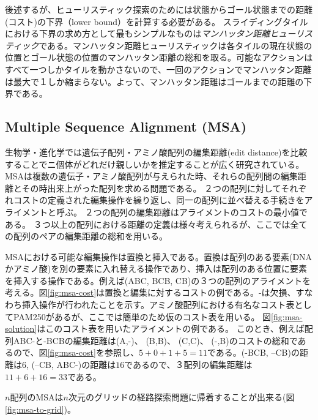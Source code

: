 \documentclass{report}
\begin{document}
後述するが、ヒューリスティック探索のためには状態からゴール状態までの距離(コスト)の下界（lower bound）を計算する必要がある。
スライディングタイルにおける下界の求め方として最もシンプルなものは{\it マンハッタン距離ヒューリスティック}である。マンハッタン距離ヒューリスティックは各タイルの現在状態の位置とゴール状態の位置のマンハッタン距離の総和を取る。可能なアクションはすべて一つしかタイルを動かさないので、一回のアクションでマンハッタン距離は最大で１しか縮まらない。よって、マンハッタン距離はゴールまでの距離の下界である。


\subsection{Multiple Sequence Alignment (MSA)}

生物学・進化学では遺伝子配列・アミノ酸配列の編集距離(edit distance)を比較することでニ個体がどれだけ親しいかを推定することが広く研究されている。
MSAは複数の遺伝子・アミノ酸配列が与えられた時、それらの配列間の編集距離とその時出来上がった配列を求める問題である。
２つの配列に対してそれぞれコストの定義された編集操作を繰り返し、同一の配列に並べ替える手続きをアライメントと呼ぶ。
２つの配列の編集距離はアライメントのコストの最小値である。
３つ以上の配列における距離の定義は様々考えられるが、ここでは全ての配列のペアの編集距離の総和を用いる。

MSAにおける可能な編集操作は置換と挿入である。置換は配列のある要素(DNAかアミノ酸)を別の要素に入れ替える操作であり、挿入は配列のある位置に要素を挿入する操作である。例えば(ABC, BCB, CB)の３つの配列のアライメントを考える。図\ref{fig:msa-cost}は置換と編集に対するコストの例である。-は欠損、すなわち挿入操作が行われたことを示す。アミノ酸配列における有名なコスト表としてPAM250があるが、ここでは簡単のため仮のコスト表を用いる\cite{MSA}。
図\ref{fig:msa-solution}はこのコスト表を用いたアライメントの例である。
このとき、例えば配列ABC-と-BCBの編集距離は(A,-)、 (B,B)、 (C,C)、 (-,B)のコストの総和であるので、図\ref{fig:msa-cost}を参照し、$5+0+1+5=11$である。(-BCB, --CB)の距離は$6$, (--CB, ABC-)の距離は$16$であるので、３配列の編集距離は$11+6+16=33$である。

$n$配列のMSAは$n$次元のグリッドの経路探索問題に帰着することが出来る(図\ref{fig:msa-to-grid})。
\end{document}
